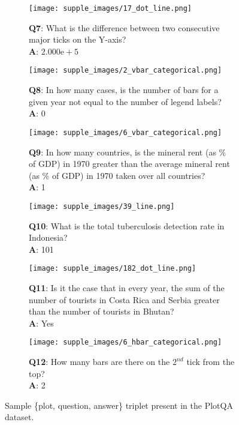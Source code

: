 \documentclass[10pt,twocolumn,letterpaper]{article}
\begin{document}
\begin{figure*}
\centering
\begin{subfigure}{.45\textwidth}
\centering
\texttt{[image: supple\_images/17\_dot\_line.png]}
\caption*{
\textbf{Q7}: What is the difference between two consecutive major ticks on the Y-axis?\\
\textbf{A}: $2.000\mathrm{e}+5$
}
\end{subfigure}
\hspace{0.5cm}
\begin{subfigure}{.45\textwidth}
\centering
\texttt{[image: supple\_images/2\_vbar\_categorical.png]}
\caption*{\textbf{Q8}: In how many cases, is the number of bars for a given year not equal to the number of legend labels?\\
\textbf{A}: 0
}
\end{subfigure}
\begin{subfigure}{.45\textwidth}
\centering
\texttt{[image: supple\_images/6\_vbar\_categorical.png]}
\caption*{\textbf{Q9}: In how many countries, is the mineral rent (as \% of GDP) in 1970 greater than the average mineral rent (as \% of GDP) in 1970 taken over all countries?\\
\textbf{A}: 1
}
\end{subfigure}
\hspace{0.5cm}
\begin{subfigure}{.45\textwidth}
\centering
\texttt{[image: supple\_images/39\_line.png]}
\caption*{\textbf{Q10}: What is the total tuberculosis detection rate in Indonesia?\\
\textbf{A}: 101
}
\end{subfigure}
\begin{subfigure}{.45\textwidth}
\centering
\texttt{[image: supple\_images/182\_dot\_line.png]}
\caption*{\textbf{Q11}: Is it the case that in every year, the sum of the number of tourists in Costa Rica and Serbia greater than the number of tourists in Bhutan?\\
\textbf{A}: Yes
}
\end{subfigure}
\hspace{0.5cm}
\begin{subfigure}{.45\textwidth}
\centering
\texttt{[image: supple\_images/6\_hbar\_categorical.png]}
\caption*{\textbf{Q12}: How many bars are there on the $2^{nd}$ tick from the top?\\
\textbf{A}: 2
}
\end{subfigure}
\caption{Sample \{plot, question, answer\} triplet present in the PlotQA dataset.}
\label{fig:supple_dataset_examples}
\end{figure*}
\end{document}

